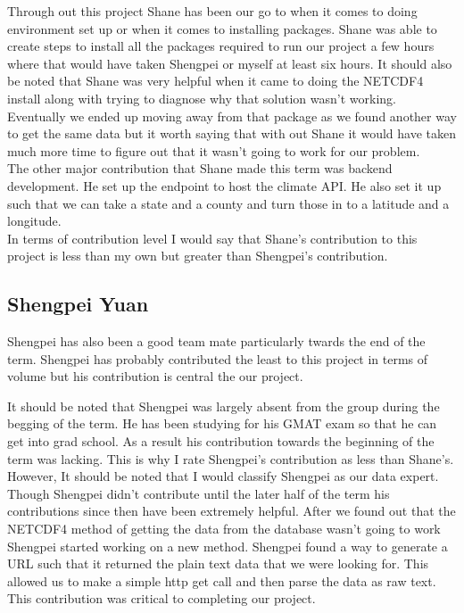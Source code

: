 \documentclass[onecolumn, draftclsnofoot,10pt, compsoc]{article}
\begin{document}
	Through out this project Shane has been our go to when it comes to doing environment set up or when it comes to installing packages. Shane was able to create steps to install all the packages required to run our project a few hours where that would have taken Shengpei or myself at least six hours. It should also be noted that Shane was very helpful when it came to doing the NETCDF4 install along with trying to diagnose why that solution wasn't working. Eventually we ended up moving away from that package as we found another way to get the same data but it worth saying that with out Shane it would have taken much more time to figure out that it wasn't going to work for our problem.\\
	
	The other major contribution that Shane made this term was backend development. He set up the endpoint to host the climate API. He also set it up such that we can take a state and a county and turn those in to a latitude and a longitude.\\
	
	In terms of contribution level I would say that Shane's contribution to this project is less than my own but greater than Shengpei's contribution.\\
	
	\subsection{Shengpei Yuan}
	Shengpei has also been a good team mate particularly twards the end of the term. Shengpei has probably contributed the least to this project in terms of volume but his contribution is central the our project. 
	
	It should be noted that Shengpei was largely absent from the group during the begging of the term. He has been studying for his GMAT exam so that he can get into grad school. As a result his contribution towards the beginning of the term was lacking. This is why I rate Shengpei's contribution as less than Shane's.\\
	
	However, It should be noted that I would classify Shengpei as our data expert. Though Shengpei didn't contribute until the later half of the term his contributions since then have been extremely helpful. After we found out that the NETCDF4 method of getting the data from the database wasn't going to work Shengpei started working on a new method. Shengpei found a way to generate a URL such that it returned the plain text data that we were looking for. This allowed us to make a simple http get call and then parse the data as raw text. This contribution was critical to completing our project.\\
	
\end{document}
